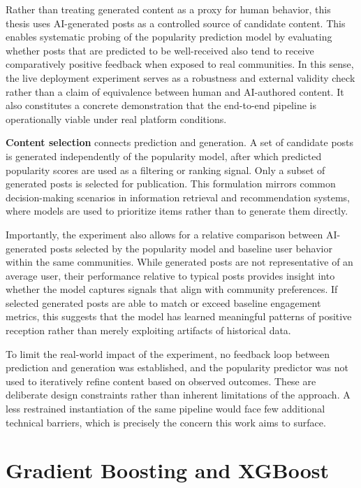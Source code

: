 Rather than treating generated content as a proxy for human behavior, this thesis uses AI-generated posts as a controlled source of candidate content. This enables systematic probing of the popularity prediction model by evaluating whether posts that are predicted to be well-received also tend to receive comparatively positive feedback when exposed to real communities. In this sense, the live deployment experiment serves as a robustness and external validity check rather than a claim of equivalence between human and AI-authored content. It also constitutes a concrete demonstration that the end-to-end pipeline is operationally viable under real platform conditions.

\textbf{Content selection} connects prediction and generation. A set of candidate posts is generated independently of the popularity model, after which predicted popularity scores are used as a filtering or ranking signal. Only a subset of generated posts is selected for publication. This formulation mirrors common decision-making scenarios in information retrieval and recommendation systems, where models are used to prioritize items rather than to generate them directly.

Importantly, the experiment also allows for a relative comparison between AI-generated posts selected by the popularity model and baseline user behavior within the same communities. While generated posts are not representative of an average user, their performance relative to typical posts provides insight into whether the model captures signals that align with community preferences. If selected generated posts are able to match or exceed baseline engagement metrics, this suggests that the model has learned meaningful patterns of positive reception rather than merely exploiting artifacts of historical data.

To limit the real-world impact of the experiment, no feedback loop between prediction and generation was established, and the popularity predictor was not used to iteratively refine content based on observed outcomes. These are deliberate design constraints rather than inherent limitations of the approach. A less restrained instantiation of the same pipeline would face few additional technical barriers, which is precisely the concern this work aims to surface.


\section{Gradient Boosting and XGBoost}

